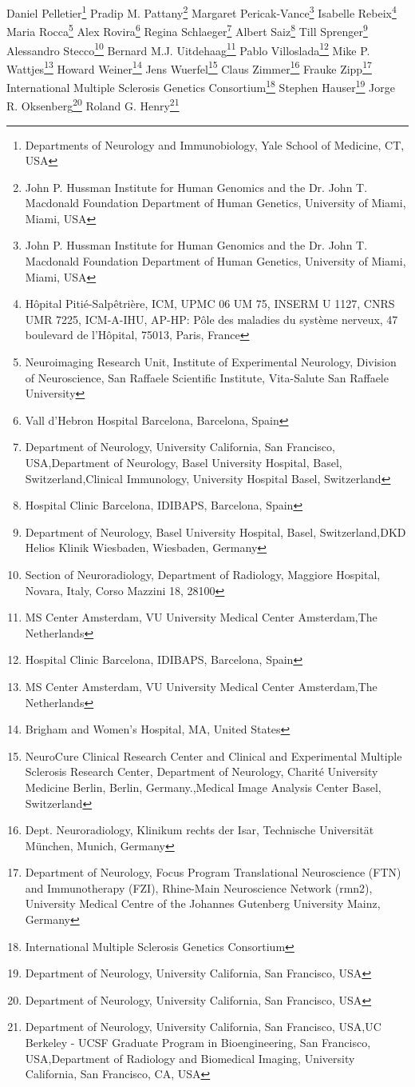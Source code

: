 Daniel Pelletier\footnote[19]{Departments of Neurology and Immunobiology, Yale School of Medicine, CT, USA}
Pradip M. Pattany\footnote[24]{John P. Hussman Institute for Human Genomics and the Dr. John T. Macdonald Foundation Department of Human Genetics, University of Miami, Miami, USA}
Margaret Pericak-Vance\footnote[24]{John P. Hussman Institute for Human Genomics and the Dr. John T. Macdonald Foundation Department of Human Genetics, University of Miami, Miami, USA}
Isabelle Rebeix\footnote[17]{Hôpital Pitié-Salpêtrière, ICM, UPMC 06 UM 75, INSERM U 1127, CNRS UMR 7225, ICM-A-IHU, AP-HP: Pôle des maladies du système nerveux, 47 boulevard de l'Hôpital, 75013, Paris, France}
Maria Rocca\footnote[15]{Neuroimaging Research Unit, Institute of Experimental Neurology, Division of Neuroscience, San Raffaele Scientific Institute, Vita-Salute San Raffaele University}
Alex Rovira\footnote[10]{Vall d’Hebron Hospital Barcelona, Barcelona, Spain}
Regina Schlaeger\footnote[1,6,8]{Department of Neurology, University California, San Francisco,  USA,Department of Neurology, Basel University Hospital, Basel, Switzerland,Clinical Immunology, University Hospital Basel, Switzerland}
Albert Saiz\footnote[23]{Hospital Clinic Barcelona, IDIBAPS, Barcelona, Spain}
Till Sprenger\footnote[6,26]{Department of Neurology, Basel University Hospital, Basel, Switzerland,DKD Helios Klinik Wiesbaden, Wiesbaden, Germany}
Alessandro Stecco\footnote[27]{Section of Neuroradiology, Department of Radiology, Maggiore Hospital, Novara, Italy, Corso Mazzini 18, 28100}
Bernard M.J. Uitdehaag\footnote[28]{MS Center Amsterdam, VU University Medical Center Amsterdam,The Netherlands}
Pablo Villoslada\footnote[23]{Hospital Clinic Barcelona, IDIBAPS, Barcelona, Spain}
Mike P. Wattjes\footnote[28]{MS Center Amsterdam, VU University Medical Center Amsterdam,The Netherlands}
Howard Weiner\footnote[7]{Brigham and Women's Hospital, MA, United States}
Jens Wuerfel\footnote[3,29]{NeuroCure Clinical Research Center and Clinical and Experimental Multiple Sclerosis Research Center, Department of Neurology, Charité University Medicine Berlin, Berlin, Germany.,Medical Image Analysis Center Basel, Switzerland}
Claus Zimmer\footnote[30]{Dept. Neuroradiology, Klinikum rechts der Isar, Technische Universität München, Munich, Germany}
Frauke Zipp\footnote[16]{Department of Neurology, Focus Program Translational Neuroscience (FTN) and Immunotherapy (FZI), Rhine-Main Neuroscience Network (rmn2), University Medical Centre of the Johannes Gutenberg University Mainz, Germany}
International Multiple Sclerosis Genetics Consortium\footnote[31]{International Multiple Sclerosis Genetics Consortium}
Stephen Hauser\footnote[1]{Department of Neurology, University California, San Francisco,  USA}
Jorge R. Oksenberg\footnote[1]{Department of Neurology, University California, San Francisco,  USA}
Roland G. Henry\footnote[1,2,11]{Department of Neurology, University California, San Francisco,  USA,UC Berkeley - UCSF Graduate Program in Bioengineering, San Francisco, USA,Department of Radiology and Biomedical Imaging, University California, San Francisco, CA, USA}

